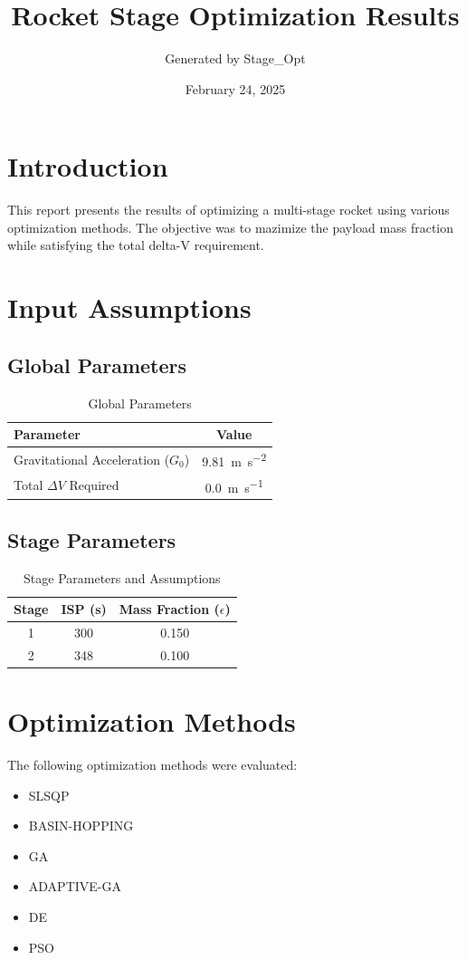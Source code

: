 \documentclass{article}
\title{Rocket Stage Optimization Results}
\author{Generated by Stage\_Opt}
\date{February 24, 2025}
\begin{document}
\maketitle

\section{Introduction}
This report presents the results of optimizing a multi-stage rocket using various optimization methods. The objective was to mazimize the payload mass fraction while satisfying the total delta-V requirement.

\section{Input Assumptions}
\subsection{Global Parameters}
\begin{table}[H]
\centering
\caption{Global Parameters}
\begin{tabular}{lS[table-format=4.2]}
\toprule
Parameter & {Value} \\
\midrule
Gravitational Acceleration ($G_0$) & \SI{9.81}{\meter\per\second\squared} \\
Total $\Delta V$ Required & \SI{0.0}{\meter\per\second} \\
\bottomrule
\end{tabular}
\end{table}

\subsection{Stage Parameters}
\begin{table}[H]
\centering
\caption{Stage Parameters and Assumptions}
\begin{tabular}{cS[table-format=3.0]S[table-format=1.3]}
\toprule
Stage & {ISP (\si{\second})} & {Mass Fraction ($\epsilon$)} \\
 & 300 & 0.150 \\
2 & 348 & 0.100 \\
\bottomrule
\end{tabular}
\end{table}

\section{Optimization Methods}\citep{pso_ascent_2013, evolutionary_rocket_2022, pso_micro_launch_2012, de_ascent_2021}
The following optimization methods were evaluated:
\begin{itemize}
\item SLSQP
\item BASIN-HOPPING
\item GA
\item ADAPTIVE-GA
\item DE
\item PSO
\end{itemize}
\end{document}
